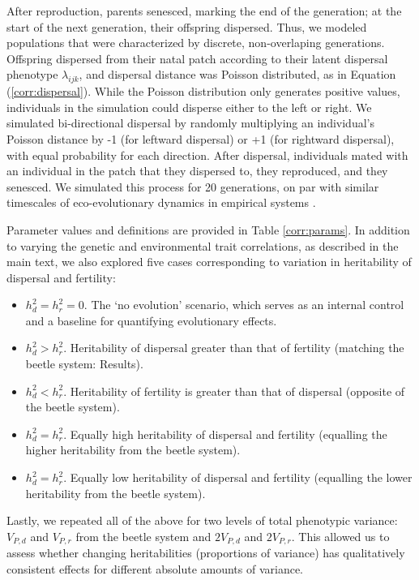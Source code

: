 \documentclass[11pt]{article}
\begin{document}
After reproduction, parents senesced, marking the end of the generation; at the start of the next generation, their offspring dispersed.
Thus, we modeled populations that were characterized by discrete, non-overlaping generations.
Offspring dispersed from their natal patch according to their latent dispersal phenotype $\lambda_{ijk}$, and dispersal distance was Poisson distributed, as in Equation (\ref{corr:dispersal}).
While the Poisson distribution only generates positive values, individuals in the simulation could disperse either to the left or right. We simulated bi-directional dispersal by randomly multiplying an individual's Poisson distance by -1 (for leftward dispersal) or +1 (for rightward dispersal), with equal probability for each direction.
After dispersal, individuals mated with an individual in the patch that they dispersed to, they reproduced, and they senesced.
We simulated this process for 20 generations, on par with similar timescales of eco-evolutionary dynamics in empirical systems \citep{williams_rapid_2016,ochocki_rapid_2017,weiss-lehman_rapid_2017}.

Parameter values and definitions are provided in Table \ref{corr:params}. In addition to varying the genetic and environmental trait correlations, as described in the main text, we also explored five cases corresponding to variation in heritability of dispersal and fertility:
\begin{itemize}
  \item $h^{2}_d = h^{2}_r = 0$. The `no evolution' scenario, which serves as an internal control and a baseline for quantifying evolutionary effects.
  \item $h^{2}_d > h^{2}_r$. Heritability of dispersal greater than that of fertility (matching the beetle system: Results).
  \item $h^{2}_d < h^{2}_r$. Heritability of fertility is greater than that of dispersal (opposite of the beetle system).
  \item $h^{2}_d = h^{2}_r$. Equally high heritability of dispersal and fertility (equalling the higher heritability from the beetle system).
  \item $h^{2}_d = h^{2}_r$. Equally low heritability of dispersal and fertility (equalling the lower heritability from the beetle system).
\end{itemize}
Lastly, we repeated all of the above for two levels of total phenotypic variance: $V_{P,d}$ and $V_{P,r}$ from the beetle system and $2V_{P,d}$ and $2V_{P,r}$.
This allowed us to assess whether changing heritabilities (proportions of variance) has qualitatively consistent effects for different absolute amounts of variance.
\end{document}
